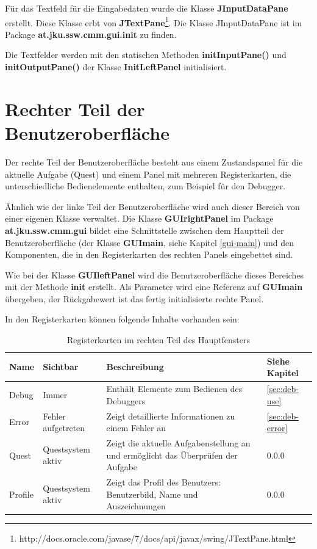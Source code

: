 Für das Textfeld für die Eingabedaten wurde die Klasse \textbf{JInputDataPane} erstellt. Diese Klasse erbt von \textbf{JTextPane}\footnote{http://docs.oracle.com/javase/7/docs/api/javax/swing/JTextPane.html}. Die Klasse JInputDataPane ist im Package \textbf{at.jku.ssw.cmm.gui.init} zu finden. 

Die Textfelder werden mit den statischen Methoden \textbf{initInputPane()} und \textbf{initOutputPane()} der Klasse \textbf{InitLeftPanel} initialisiert.

\section{Rechter Teil der Benutzeroberfläche}
Der rechte Teil der Benutzeroberfläche besteht aus einem Zustandspanel für die aktuelle Aufgabe (Quest) und einem Panel mit mehreren Registerkarten, die unterschiedliche Bedienelemente enthalten, zum Beispiel für den Debugger.

Ähnlich wie der linke Teil der Benutzeroberfläche wird auch dieser Bereich von einer eigenen Klasse verwaltet. Die Klasse \textbf{GUIrightPanel} im Package \textbf{at.jku.ssw.cmm.gui} bildet eine Schnittstelle zwischen dem Hauptteil der Benutzeroberfläche (der Klasse \textbf{GUImain}, siehe Kapitel \ref{gui-main}) und den Komponenten, die in den Registerkarten des rechten Panels eingebettet sind.

Wie bei der Klasse \textbf{GUIleftPanel} wird die Benutzeroberfläche dieses Bereiches mit der Methode \textbf{init} erstellt. Als Parameter wird eine Referenz auf \textbf{GUImain} übergeben, der Rückgabewert ist das fertig initialisierte rechte Panel.

In den Registerkarten können folgende Inhalte vorhanden sein:
\def\arraystretch{1.6}
\begin{table}[h!]
\begin{tabular}{|l|p{2.5cm}|p{6.6cm}|l|}
\hline
\textbf{Name}&\textbf{Sichtbar}&\textbf{Beschreibung}&\textbf{Siehe Kapitel}\\
\hline
Debug&Immer&Enthält Elemente zum Bedienen des Debuggers&\ref{sec:deb-use}\\
Error&Fehler aufgetreten&Zeigt detaillierte Informationen zu einem Fehler an&\ref{sec:deb-error}\\
Quest&Questsystem aktiv&Zeigt die aktuelle Aufgabenstellung an und ermöglicht das Überprüfen der Aufgabe&0.0.0\\ %
Profile&Questsystem aktiv&Zeigt das Profil des Benutzers: Benutzerbild, Name und Auszeichnungen&0.0.0\\ %
\hline
\end{tabular}
\caption{Registerkarten im rechten Teil des Hauptfensters}\label{tab:gui-main-right-reg}
\end{table}

